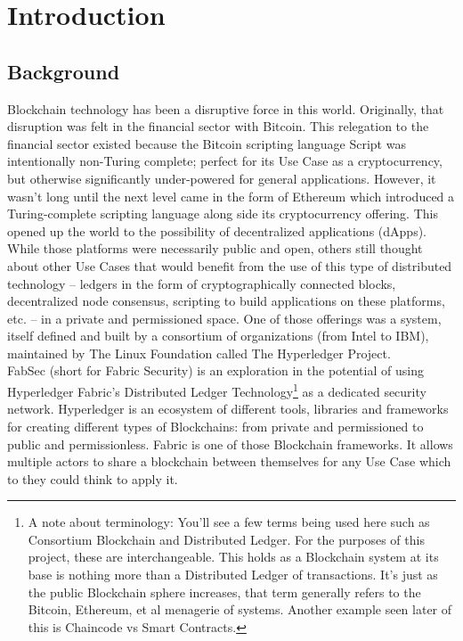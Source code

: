 \section{Introduction}
	\subsection{Background}
		\hspace{10mm}Blockchain technology has been a disruptive force in this world. Originally, that disruption was felt in the financial sector with Bitcoin. This relegation to the financial sector existed because the Bitcoin scripting language Script was intentionally non-Turing complete; perfect for its Use Case as a cryptocurrency, but otherwise significantly under-powered for general applications. However, it wasn't long until the next level came in the form of Ethereum which introduced a Turing-complete scripting language along side its cryptocurrency offering. This opened up the world to the possibility of decentralized applications (dApps). While those platforms were necessarily public and open, others still thought about other Use Cases that would benefit from the use of this type of distributed technology -- ledgers in the form of cryptographically connected blocks, decentralized node consensus, scripting to build applications on these platforms, etc. -- in a private and permissioned space. One of those offerings was a system, itself defined and built by a consortium of organizations (from Intel to IBM), maintained by The Linux Foundation called The Hyperledger Project.\\
	
		\hspace{10mm}FabSec (short for Fabric Security) is an exploration in the potential of using Hyperledger Fabric's Distributed Ledger Technology\footnote{A note about terminology: You'll see a few terms being used here such as Consortium Blockchain and Distributed Ledger. For the purposes of this project, these are interchangeable. This holds as a Blockchain system at its base is nothing more than a Distributed Ledger of transactions. It's just as the public Blockchain sphere increases, that term generally refers to the Bitcoin, Ethereum, et al menagerie of systems. Another example seen later of this is Chaincode vs Smart Contracts.} as a dedicated security network. Hyperledger is an ecosystem of different tools, libraries and frameworks for creating different types of Blockchains: from private and permissioned to public and permissionless. Fabric is one of those Blockchain frameworks. It allows multiple actors to share a blockchain between themselves for any Use Case which to they could think to apply it.\\
	
